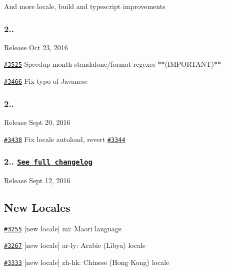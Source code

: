 And more locale, build and typescript improvements

\subsubsection*{2..}


\begin{DoxyItemize}
\item Release Oct 23, 2016
\item \href{https://github.com/moment/moment/pull/3525}{\tt \#3525} Speedup month standalone/format regexes $\ast$$\ast$(I\+M\+P\+O\+R\+T\+A\+NT)$\ast$$\ast$
\item \href{https://github.com/moment/moment/pull/3466}{\tt \#3466} Fix typo of Javanese
\end{DoxyItemize}

\subsubsection*{2..}


\begin{DoxyItemize}
\item Release Sept 20, 2016
\item \href{https://github.com/moment/moment/pull/3438}{\tt \#3438} Fix locale autoload, revert \href{https://github.com/moment/moment/pull/3344}{\tt \#3344}
\end{DoxyItemize}

\subsubsection*{2.. \href{https://gist.github.com/ichernev/10e1c5bf647545c72ca30e9628a09ed3}{\tt See full changelog}}


\begin{DoxyItemize}
\item Release Sept 12, 2016
\end{DoxyItemize}

\subsection*{New Locales}


\begin{DoxyItemize}
\item \href{https://github.com/moment/moment/pull/3255}{\tt \#3255} \mbox{[}new locale\mbox{]} mi\+: Maori language
\item \href{https://github.com/moment/moment/pull/3267}{\tt \#3267} \mbox{[}new locale\mbox{]} ar-\/ly\+: Arabic (Libya) locale
\item \href{https://github.com/moment/moment/pull/3333}{\tt \#3333} \mbox{[}new locale\mbox{]} zh-\/hk\+: Chinese (Hong Kong) locale
\end{DoxyItemize}

